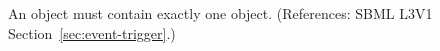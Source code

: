 An \Event object must contain exactly one \Trigger object.  (References:
SBML L3V1 Section~\ref{sec:event-trigger}.)
